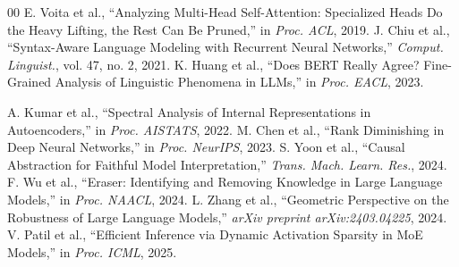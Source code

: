 \documentclass[conference]{IEEEtran}
\begin{document}
\begin{thebibliography}{00}
 E. Voita et al., ``Analyzing Multi-Head Self-Attention: Specialized Heads Do the Heavy Lifting, the Rest Can Be Pruned,'' in \emph{Proc. ACL}, 2019.
 J. Chiu et al., ``Syntax-Aware Language Modeling with Recurrent Neural Networks,'' \emph{Comput. Linguist.}, vol. 47, no. 2, 2021.
 K. Huang et al., ``Does BERT Really Agree? Fine-Grained Analysis of Linguistic Phenomena in LLMs,'' in \emph{Proc. EACL}, 2023.

 A. Kumar et al., ``Spectral Analysis of Internal Representations in Autoencoders,'' in \emph{Proc. AISTATS}, 2022.
 M. Chen et al., ``Rank Diminishing in Deep Neural Networks,'' in \emph{Proc. NeurIPS}, 2023.
 S. Yoon et al., ``Causal Abstraction for Faithful Model Interpretation,'' \emph{Trans. Mach. Learn. Res.}, 2024.
 F. Wu et al., ``Eraser: Identifying and Removing Knowledge in Large Language Models,'' in \emph{Proc. NAACL}, 2024.
 L. Zhang et al., ``Geometric Perspective on the Robustness of Large Language Models,'' \emph{arXiv preprint arXiv:2403.04225}, 2024.
 V. Patil et al., ``Efficient Inference via Dynamic Activation Sparsity in MoE Models,'' in \textit{Proc. ICML}, 2025.


\end{thebibliography}
\end{document}
